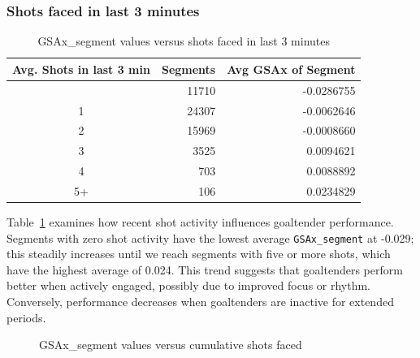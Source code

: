 \documentclass[
  letterpaper,
  DIV=11,
  numbers=noendperiod]{scrartcl}
\begin{document}
\subsubsection{Shots faced in last 3
minutes}\label{shots-faced-in-last-3-minutes}

\begin{longtable}[]{@{}crr@{}}

\caption{\label{tbl-last3}GSAx\_segment values versus shots faced in
last 3 minutes}

\tabularnewline

\toprule\noalign{}
Avg. Shots in last 3 min & Segments & Avg GSAx of Segment \\
\midrule\noalign{}
\endhead
\bottomrule\noalign{}
\endlastfoot
0 & 11710 & -0.0286755 \\
1 & 24307 & -0.0062646 \\
2 & 15969 & -0.0008660 \\
3 & 3525 & 0.0094621 \\
4 & 703 & 0.0088892 \\
5+ & 106 & 0.0234829 \\

\end{longtable}

Table~\ref{tbl-last3} examines how recent shot activity influences
goaltender performance. Segments with zero shot activity have the lowest
average \texttt{GSAx\_segment} at -0.029; this steadily increases until
we reach segments with five or more shots, which have the highest
average of 0.024. This trend suggests that goaltenders perform better
when actively engaged, possibly due to improved focus or rhythm.
Conversely, performance decreases when goaltenders are inactive for
extended periods.

\begin{figure}


\caption{\label{fig-shots}GSAx\_segment values versus cumulative shots
faced}

\end{figure}%
\end{document}
